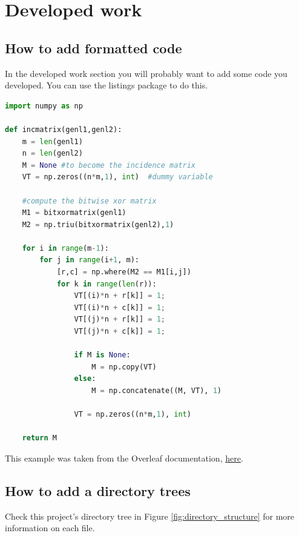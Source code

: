 \chapter{Developed work}
\label{chapter:developed_work}

\section{How to add formatted code}

In the developed work section you will probably want to add some code you developed. You can use the listings package to do this. 

\begin{lstlisting}[language=Python]
import numpy as np
	
def incmatrix(genl1,genl2):
	m = len(genl1)
	n = len(genl2)
	M = None #to become the incidence matrix
	VT = np.zeros((n*m,1), int)  #dummy variable
	
	#compute the bitwise xor matrix
	M1 = bitxormatrix(genl1)
	M2 = np.triu(bitxormatrix(genl2),1) 

	for i in range(m-1):
		for j in range(i+1, m):
			[r,c] = np.where(M2 == M1[i,j])
			for k in range(len(r)):
				VT[(i)*n + r[k]] = 1;
				VT[(i)*n + c[k]] = 1;
				VT[(j)*n + r[k]] = 1;
				VT[(j)*n + c[k]] = 1;
				
				if M is None:
					M = np.copy(VT)
				else:
					M = np.concatenate((M, VT), 1)
				
				VT = np.zeros((n*m,1), int)
	
	return M
\end{lstlisting}

This example was taken from the Overleaf documentation, \href{https://www.overleaf.com/learn/latex/Code_listing}{here}.

\section{How to add a directory trees}

Check this project's directory tree in Figure \ref{fig:directory_structure} for more information on each file.


